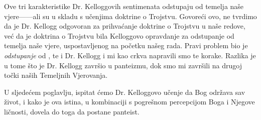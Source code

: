 Ove tri karakteristike Dr. Kelloggovih sentimenata odstupaju od temelja naše vjere——ali su u skladu s učenjima doktrine o Trojstvu. Govoreći ovo, ne tvrdimo da je Dr. Kellogg odgovoran za prihvaćanje doktrine o Trojstvu u naše redove, već da je doktrina o Trojstvu bila Kelloggovo opravdanje za odstupanje od temelja naše vjere, uspostavljenog na početku našeg rada. Pravi problem bio je \textit{odstupanje} od , te i Dr. Kellogg i mi kao crkva napravili smo te korake. Razlika je u tome što je Dr. Kellogg završio u panteizmu, dok smo mi završili na drugoj točki naših Temeljnih Vjerovanja.

U sljedećem poglavlju, ispitat ćemo Dr. Kelloggovo učenje da Bog održava sav život, i kako je ova istina, u kombinaciji s pogrešnom percepcijom Boga i Njegove ličnosti, dovela do toga da postane panteist.

